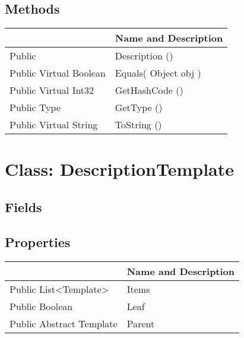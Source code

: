 \documentclass[11pt, oneside, a4paper]{book}
\begin{document}
\subsection{Methods}
\begin{center}
\begin{tabular}{| p{3cm} | p{12cm} | }
\hline
\textbf{ } & \textbf{ Name and Description}\\
\hline
 Public  &  Description ()\hypertarget{SoftwareEngineeringTools.{}Documentation.{}Description.{}Description}{}\\
\hline
 Public  Virtual  Boolean &  Equals(\hypertarget{SoftwareEngineeringTools.{}Documentation.{}Description.{}Equals\_Object}{} Object  obj  )\\
\hline
 Public  Virtual  Int32 &  GetHashCode ()\hypertarget{SoftwareEngineeringTools.{}Documentation.{}Description.{}GetHashCode}{}\\
\hline
 Public  Type &  GetType ()\hypertarget{SoftwareEngineeringTools.{}Documentation.{}Description.{}GetType}{}\\
\hline
 Public  Virtual  String &  ToString ()\hypertarget{SoftwareEngineeringTools.{}Documentation.{}Description.{}ToString}{}\\
\hline
\end{tabular}
\end{center}
 


\hypertarget{SoftwareEngineeringTools.{}Documentation.{}DescriptionTemplate}{}
\section{Class: DescriptionTemplate}

\subsection{Fields}

\subsection{Properties}
\begin{center}
\begin{tabular}{| p{3cm} | p{12cm} | }
\hline
\textbf{ } & \textbf{ Name and Description}\\
\hline
 Public  List<Template> &  Items\hypertarget{SoftwareEngineeringTools.{}Documentation.{}DescriptionTemplate.{}Items}{}\\
\hline
 Public  Boolean &  Leaf\hypertarget{SoftwareEngineeringTools.{}Documentation.{}DescriptionTemplate.{}Leaf}{}\\
\hline
 Public  Abstract  Template &  Parent\hypertarget{SoftwareEngineeringTools.{}Documentation.{}DescriptionTemplate.{}Parent}{}\\
\hline
\end{tabular}
\end{center}
\end{document}
